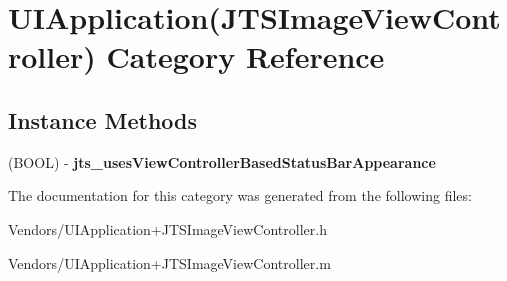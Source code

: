 \hypertarget{category_u_i_application_07_j_t_s_image_view_controller_08}{}\section{U\+I\+Application(J\+T\+S\+Image\+View\+Controller) Category Reference}
\label{category_u_i_application_07_j_t_s_image_view_controller_08}
\subsection*{Instance Methods}
\begin{DoxyCompactItemize}
\item 
\hypertarget{category_u_i_application_07_j_t_s_image_view_controller_08_a5b188eb4a79020e17db8c396917bcf07}{}(B\+O\+O\+L) -\/ {\bfseries jts\+\_\+uses\+View\+Controller\+Based\+Status\+Bar\+Appearance}\label{category_u_i_application_07_j_t_s_image_view_controller_08_a5b188eb4a79020e17db8c396917bcf07}

\end{DoxyCompactItemize}


The documentation for this category was generated from the following files\+:\begin{DoxyCompactItemize}
\item 
Vendors/U\+I\+Application+\+J\+T\+S\+Image\+View\+Controller.\+h\item 
Vendors/U\+I\+Application+\+J\+T\+S\+Image\+View\+Controller.\+m\end{DoxyCompactItemize}
